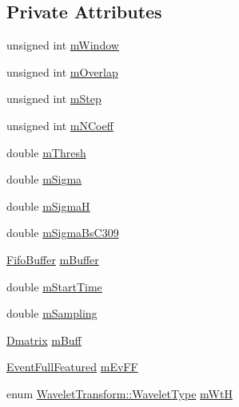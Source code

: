\subsection*{Private Attributes}
\begin{DoxyCompactItemize}
\item 
unsigned int \hyperlink{classtsa_1_1_w_d_f2_reconstruct_a97572713b59f4cc16d3ac49e459383f9}{m\+Window}
\item 
unsigned int \hyperlink{classtsa_1_1_w_d_f2_reconstruct_a07d67a2edb1226a9fe59ad22c1de6ed0}{m\+Overlap}
\item 
unsigned int \hyperlink{classtsa_1_1_w_d_f2_reconstruct_aa8a8e91d9a534af546624733364a2980}{m\+Step}
\item 
unsigned int \hyperlink{classtsa_1_1_w_d_f2_reconstruct_a36c49edf04b207715deed1029e67f660}{m\+N\+Coeff}
\item 
double \hyperlink{classtsa_1_1_w_d_f2_reconstruct_a3c8f4a6b926cbf3954528beddb924c82}{m\+Thresh}
\item 
double \hyperlink{classtsa_1_1_w_d_f2_reconstruct_a72591dca797b6437ece8fedaab01780d}{m\+Sigma}
\item 
double \hyperlink{classtsa_1_1_w_d_f2_reconstruct_aca130a979033ef5580368a4d5b86e96b}{m\+SigmaH}
\item 
double \hyperlink{classtsa_1_1_w_d_f2_reconstruct_afe74f7265462b0999a81a46406e936b1}{m\+Sigma\+Bs\+C309}
\item 
\hyperlink{classtsa_1_1_fifo_buffer}{Fifo\+Buffer} \hyperlink{classtsa_1_1_w_d_f2_reconstruct_aebba7cbb7525432c73a7820db5decd6d}{m\+Buffer}
\item 
double \hyperlink{classtsa_1_1_w_d_f2_reconstruct_a64e24fd8947b0a8e0c49163203a32b99}{m\+Start\+Time}
\item 
double \hyperlink{classtsa_1_1_w_d_f2_reconstruct_af0f0480296cff77e3e87decb61b37347}{m\+Sampling}
\item 
\hyperlink{namespacetsa_ad260cd21c1891c4ed391fe788569aba4}{Dmatrix} \hyperlink{classtsa_1_1_w_d_f2_reconstruct_a08fb7c45a063d9143cd616e4d20e06da}{m\+Buff}
\item 
\hyperlink{classtsa_1_1_event_full_featured}{Event\+Full\+Featured} \hyperlink{classtsa_1_1_w_d_f2_reconstruct_ac875897ba2a68b32a8fc5bb5943be1db}{m\+Ev\+FF}
\item 
enum \hyperlink{classtsa_1_1_wavelet_transform_a5a529de70e0004333fcf23b9cca88ce7}{Wavelet\+Transform\+::\+Wavelet\+Type} \hyperlink{classtsa_1_1_w_d_f2_reconstruct_a4950183a20397f47d014e1abc9271f78}{m\+WtH}
\item 

\end{DoxyCompactItemize}
